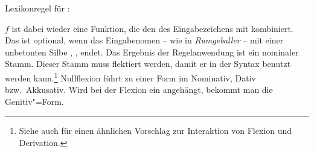 \eas
Lexikonregel für \geenen:\\
\label{lr-gee-nom}%
\zs

\noindent
$f$ ist dabei wieder eine Funktion, die den \phonw des Eingabezeichens
mit \gee kombiniert. 
Das  ist optional, wenn das Eingabenomen -- wie \zb in \emph{Rumgeballer} --
mit einer unbetonten Silbe , ,  endet.
Das Ergebnis der Regelanwendung ist ein nominaler Stamm. Dieser Stamm
muss flektiert werden, damit er in der Syntax benutzt werden kann.\footnote{
        Siehe auch \citet[]{Koenig99a} für einen
        ähnlichen Vorschlag zur Interaktion von Flexion und Derivation.%
}
Nullflexion führt zu einer Form
im Nominativ, Dativ bzw.\ Akkusativ. Wird bei der Flexion ein  angehängt,
bekommt man die Genitiv"=Form.


